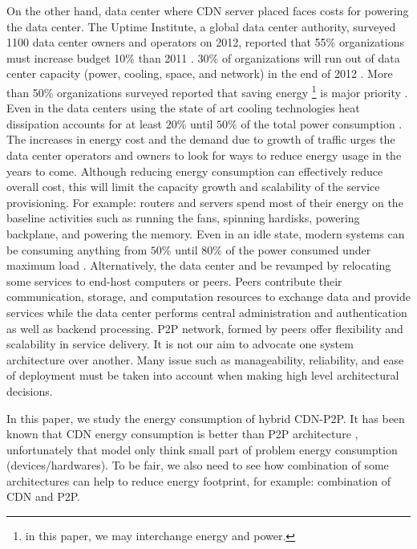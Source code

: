 \documentclass[JIP]{ipsj}
\begin{document}
On the other hand, data center where CDN server placed faces costs for powering the data center.
The Uptime Institute, a global data center authority, surveyed 1100 data center owners and operators on 2012, reported that 55\% organizations must increase budget 10\% than 2011 \cite{uptime}.  
30\% of organizations will run out of data center capacity (power, cooling, space, and network) in the end of 2012 \cite{uptime}. 
More than 50\% organizations surveyed reported that saving energy \footnote{in this paper, we may interchange energy and power.} is major priority \cite{uptime}.
Even in the data centers using the state of art cooling technologies heat dissipation accounts for at least $20\%$ until $50\%$ of the total power consumption 
\cite{google}.
The increases in energy cost and the demand due to growth of traffic urges the data center operators and owners to look for ways to reduce energy usage in the years to come.
Although reducing energy consumption can effectively reduce overall cost, this will limit the capacity growth and scalability of the service provisioning.
For example: routers and servers spend most of their energy on the baseline activities such as running the fans, spinning hardisks, powering backplane, and powering the memory. 
Even in an idle state, modern systems can be consuming anything from $50\%$ until $80\%$ of the power consumed under maximum load \cite{4404806,4509688}.
Alternatively, the data center and be revamped by relocating some services to end-host computers or peers.
Peers contribute their communication, storage, and computation resources to exchange data and provide services while the data center performs central administration and authentication as well as backend processing.
P2P network, formed by peers offer flexibility and scalability in service delivery.
It is not our aim to advocate one system architecture over another.
Many issue such as manageability, reliability, and ease of deployment must be taken into account when making high level architectural decisions.

In this paper, we study the energy consumption of hybrid CDN-P2P.  
It has been known that CDN energy consumption is better than P2P architecture \cite{feldmann2010energy,baliga2007energy}, unfortunately that model only think small part of problem energy consumption (devices/hardwares).
To be fair, we also need to see how combination of some architectures can help to reduce energy footprint, for example: combination of CDN and P2P.
\end{document}
